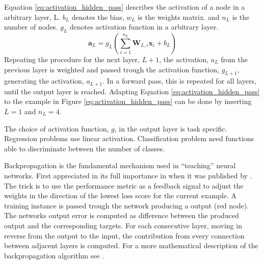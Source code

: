Equation \eqref{eq:activation_hidden_pass} describes the activation of a node in a arbitrary layer, L. $b_L$ denotes the bias, $w_L$ is the weights matrix. and $n_L$ is the number of  nodes. $g_L$ denotes activation function in a arbitrary layer.
\begin{equation} \label{eq:activation_hidden_pass}
    \textbf{a}_L = g_L\left(\sum_{i=1}^{n_L} \textbf{W}_{L, i} \textbf{x}_i + b_L\right)
\end{equation}
Repeating the procedure for the next layer, $L+1$, the activation, $a_L$ from the previous layer is weighted and passed trough the activation function, $g_{L+1}$, generating the activation, $a_{L+1}$. In a forward pass, this is repeated for all layers, until the output layer is reached. Adapting Equation \eqref{eq:activation_hidden_pass} to the example in Figure \ref{eq:activation_hidden_pass} can be done by inserting $L=1$ and $n_L=4$.

The choice of activation function, $g$, in the output layer is task specific. Regression problems use linear activation. Classification problem need functions able to discriminate between the number of classes.

Backpropagation is the fundamental mechanism used in ``teaching'' neural networks. First appreciated in its full importance in \citeyear{RumelhartBackProp} when it was published by \citeauthor{RumelhartBackProp}. The trick is to use the performance metric as a feedback signal to adjust the weights in the direction of the lowest loss score for the current example. A training instance is passed trough the network producing a output (red node). The networks output error is computed as difference between the produced output and the corresponding targets. For each consecutive layer, moving in reverse from the output to the input, the contribution from every connection between adjacent layers is computed.
For a more mathematical description of the backpropagation algorithm see \cite{nielsen_back_prop}.

